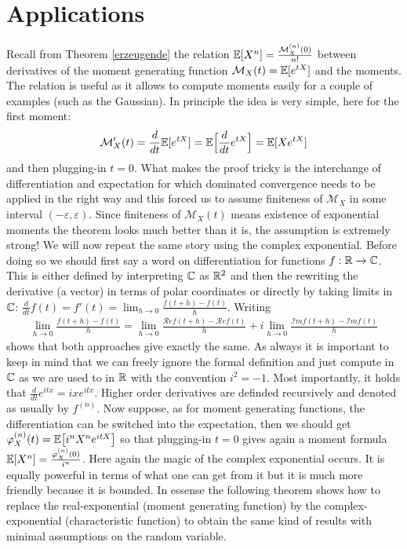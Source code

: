 	\marginpar{\textcolor{red}{Lecture 18}}


\section{Applications}\label{sec:applications}
Recall from Theorem \ref{erzeugende} the relation $\mathbb{E}[X^n]=\frac{\mathcal M_X^{(n)}(0)}{n!}$ between derivatives of the moment generating function $\mathcal M_X(t)=\mathbb{E}[e^{tX}]$ and the moments. The relation is useful as it allows to compute moments easily for a couple of examples (such as the Gaussian). In principle the idea is very simple, here for the first moment: $$\mathcal M'_X(t)=\frac{d}{dt}\mathbb{E}[e^{tX}]=\mathbb{E}\Big[\frac{d}{dt}e^{tX}\Big]=\mathbb{E}[X e^{tX}]$$ and then plugging-in $t=0$. What makes the proof tricky is the interchange of differentiation and expectation for which dominated convergence needs to be applied in the right way and this forced us to assume finiteness of $\mathcal M_X$ in some interval $(-\varepsilon, \varepsilon)$. Since finiteness of $\mathcal M_X(t)$ means existence of exponential moments the theorem looks much better than it is, the assumption is extremely strong! We will now repeat the same story using the complex exponential. Before doing so we should first say a word on differentiation for functions $f:\mathbb{R}\to \mathbb{C}$. This is either defined by interpreting $\mathbb{C}$ as $\mathbb{R}^2$ and then the rewriting the derivative (a vector) in terms of polar coordinates or directly by taking limits in $\mathbb{C}$: $\frac{d}{dt} f(t)=f'(t)=\lim_{h\to 0}\frac{f(t+h)-f(t)}{h}$. Writing 
\begin{align*}
	\lim_{h\to 0}\frac{f(t+h)-f(t)}{h}=\lim_{h\to 0}\frac{\mathcal R ef(t+h)-\mathcal R ef(t)}{h}+i\lim_{h\to 0}\frac{\mathcal I m f(t+h)-\mathcal I mf(t)}{h}
\end{align*}
shows that both approaches give exactly the same. As always it is important to keep in mind that we can freely ignore the formal definition and just compute in $\mathbb{C}$ as we are used to in $\mathbb{R}$ with the convention $i^2=-1$. Most importantly, it holds that $\frac{d}{dt} e^{itx}=ix e^{itx}$. Higher order derivatives are definded recursively and denoted as usually by $f^{(n)}$. Now suppose, as for moment generating functions, the differentiation can be switched into the expectation, then we should get $\varphi_X^{(n)}(t) = \mathbb{E} \big[ i^n X^ne^{itX} \big]$ so that plugging-in $t=0$ gives again a moment formula $\mathbb{E}[X^n]=\frac{\varphi_X^{(n)}(0)}{i^n}$. Here again the magic of the complex exponential occurs. It is equally powerful in terms of what one can get from it but it is much more friendly because it is bounded. In essense the following theorem shows how to replace the real-exponential (moment generating function) by the complex-exponential (characteristic function) to obtain the same kind of results with minimal assumptions on the random variable.
